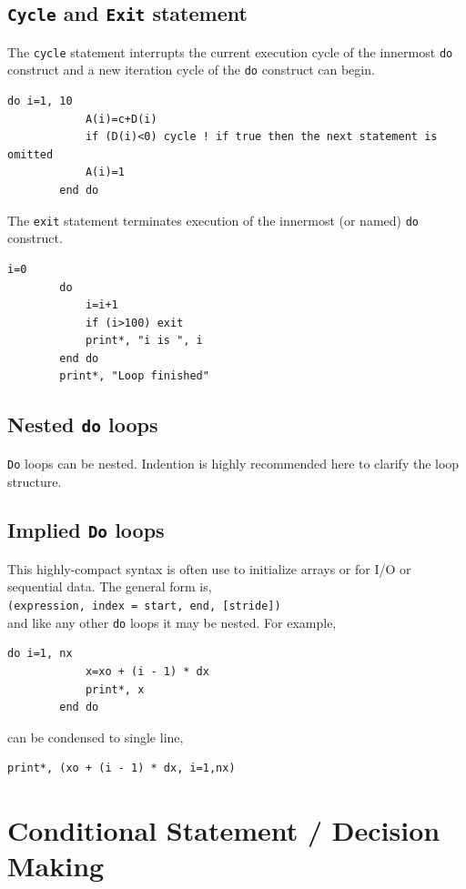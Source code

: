 \documentclass[12pt,oneside]{book}
\newcommand{\code}[1]{\lstinline[keywordstyle=\color{black},basicstyle=\ttfamily]{#1}}
\begin{document}
    \section{\code{Cycle} and \code{Exit} statement}
    The \code{cycle} statement interrupts the current execution cycle of the innermost \code{do} construct and a new iteration cycle of the \code{do} construct can begin.
    \begin{lstlisting}[numbers=none]
        do i=1, 10
            A(i)=c+D(i)
            if (D(i)<0) cycle ! if true then the next statement is omitted
            A(i)=1
        end do
    \end{lstlisting}
    The  \code{exit} statement terminates execution of the innermost (or named) \code{do} construct.
    \begin{lstlisting}[numbers=none]
        i=0
        do
            i=i+1
            if (i>100) exit
            print*, "i is ", i
        end do
        print*, "Loop finished"
    \end{lstlisting}
    \section{Nested \code{do} loops}
    \code{Do} loops can be nested. Indention is highly recommended here to clarify the loop structure.
    
    \section{Implied \code{Do} loops}
    This highly-compact syntax is often use to initialize arrays or for I/O or sequential data.
     The general form is,\\
     \lstinline[basicstyle=\ttfamily]{(expression, index = start, end, [stride])}\\
     and like any other \code{do} loops it may be nested. For example,
     \begin{lstlisting}[numbers=none]
        do i=1, nx
            x=xo + (i - 1) * dx
            print*, x
        end do
    \end{lstlisting}
    can be condensed to single line,
    \begin{lstlisting}[numbers=none]
        print*, (xo + (i - 1) * dx, i=1,nx)
    \end{lstlisting}
    \chapter{Conditional Statement / Decision Making}
\end{document}
